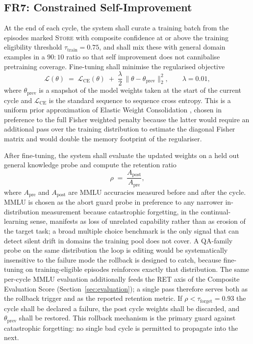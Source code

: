 \subsection{FR7: Constrained Self-Improvement}
\label{sec:fr7}

At the end of each cycle, the system shall curate a training batch from the episodes marked \textsc{Store} with composite confidence at or above the training eligibility threshold $\tau_{\text{train}} = 0.75$, and shall mix these with general domain examples in a $90{:}10$ ratio so that self improvement does not cannibalise pretraining coverage. Fine-tuning shall minimise the regularised objective
\begin{equation}
\mathcal{L}(\theta) \;=\; \mathcal{L}_{\mathrm{CE}}(\theta) \;+\; \frac{\lambda}{2} \, \lVert \theta - \theta_{\mathrm{prev}} \rVert_{2}^{2},
\qquad \lambda = 0.01,
\label{eq:l2anchor}
\end{equation}
where $\theta_{\mathrm{prev}}$ is a snapshot of the model weights taken at the start of the current cycle and $\mathcal{L}_{\mathrm{CE}}$ is the standard sequence to sequence cross entropy. This is a uniform prior approximation of Elastic Weight Consolidation \cite{doi:10.1073/pnas.1611835114}, chosen in preference to the full Fisher weighted penalty because the latter would require an additional pass over the training distribution to estimate the diagonal Fisher matrix and would double the memory footprint of the regulariser.

After fine-tuning, the system shall evaluate the updated weights on a held out general knowledge probe and compute the retention ratio
\begin{equation}
\rho \;=\; \frac{A_{\text{post}}}{A_{\text{pre}}},
\label{eq:retention}
\end{equation}
where $A_{\text{pre}}$ and $A_{\text{post}}$ are MMLU accuracies measured before and after the cycle. MMLU is chosen as the abort guard probe in preference to any narrower in-distribution measurement because catastrophic forgetting, in the continual-learning sense, manifests as loss of unrelated capability rather than as erosion of the target task; a broad multiple choice benchmark is the only signal that can detect silent drift in domains the training pool does not cover. A QA-family probe on the same distribution the loop is editing would be systematically insensitive to the failure mode the rollback is designed to catch, because fine-tuning on training-eligible episodes reinforces exactly that distribution. The same per-cycle MMLU evaluation additionally feeds the RET axis of the Composite Evaluation Score (Section~\ref{sec:evaluation}); a single pass therefore serves both as the rollback trigger and as the reported retention metric. If $\rho < \tau_{\text{forget}} = 0.93$ the cycle shall be declared a failure, the post cycle weights shall be discarded, and $\theta_{\mathrm{prev}}$ shall be restored. This rollback mechanism is the primary guard against catastrophic forgetting: no single bad cycle is permitted to propagate into the next.

